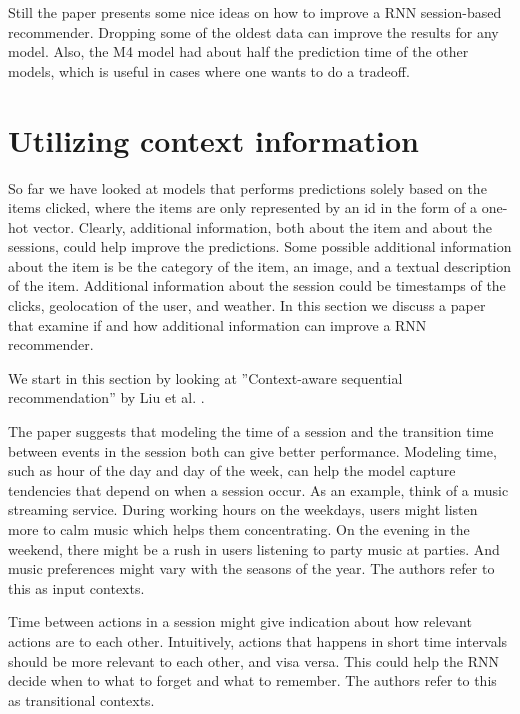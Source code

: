 Still the paper presents some nice ideas on how to improve a RNN session-based recommender. Dropping some of the oldest data can improve the results for any model. Also, the M4 model had about half the prediction time of the other models, which is useful in cases where one wants to do a tradeoff.


\section{Utilizing context information}
So far we have looked at models that performs predictions solely based on the items clicked, where the items are only represented by an id in the form of a one-hot vector. Clearly, additional information, both about the item and about the sessions, could help improve the predictions. Some possible additional information about the item is be the category of the item, an image, and a textual description of the item. Additional information about the session could be timestamps of the clicks, geolocation of the user, and weather. In this section we discuss a paper that examine if and how additional information can improve a RNN recommender.

We start in this section by looking at ''Context-aware sequential recommendation'' by Liu et al. \cite{DBLP:journals/corr/LiuWWL016}.

The paper suggests that modeling the time of a session and the transition time between events in the session both can give better performance. Modeling time, such as hour of the day and day of the week, can help the model capture tendencies that depend on when a session occur. As an example, think of a music streaming service. During working hours on the weekdays, users might listen more to calm music which helps them concentrating. On the evening in the weekend, there might be a rush in users listening to party music at parties. And music preferences might vary with the seasons of the year. The authors refer to this as input contexts.

Time between actions in a session might give indication about how relevant actions are to each other. Intuitively, actions that happens in short time intervals should be more relevant to each other, and visa versa. This could help the RNN decide when to what to forget and what to remember. The authors refer to this as transitional contexts.

